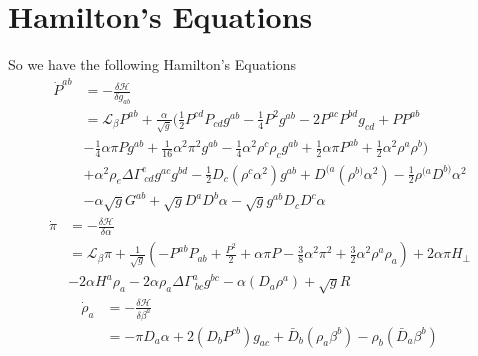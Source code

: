 \documentclass{article}
\begin{document}
\section{Hamilton's Equations}
So we have the following Hamilton's Equations
\begin{align*}
{\dot P}^{ab} &= -\frac{\delta \mathcal{H}}{\delta g_{ab}} \\ &
= \mathcal{L}_{\beta}P^{ab} + \frac{\alpha}{\sqrt{g}}(\frac{1}{2}P^{cd}P_{cd}g^{ab} - \frac{1}{4}P^{2}g^{ab} - 2P^{ac}P^{bd}g_{cd} + PP^{ab} \\
&-\frac{1}{4}\alpha \pi P g^{ab} + \frac{1}{16}\alpha^2 \pi^2 g^{ab} - \frac{1}{4}\alpha^2 \rho^{c}\rho_{c}g^{ab} + \frac{1}{2}\alpha \pi P^{ab} + \frac{1}{2}\alpha^2\rho^{a}\rho^{b}) \\
&+ \alpha^2 \rho_{e}\Delta \Gamma^{e}_{~cd}g^{ac}g^{bd} - \frac{1}{2}D_{c}(\rho^{c} \alpha^2)g^{ab} + D^{(a}(\rho^{b)} \alpha^2) - \frac{1}{2}\rho^{(a}D^{b)}\alpha^2\\
& - \alpha \sqrt{g}G^{ab} + \sqrt{g} D^{a}D^{b}\alpha - \sqrt{g}g^{ab}D_{c}D^{c} \alpha
\end{align*}
\begin{align*}
{\dot \pi} & = - \frac{\delta \mathcal{H}}{\delta \alpha} \\
& = \mathcal{L}_{\beta} \pi + \frac{1}{\sqrt{g}}(-P^{ab}P_{ab} + \frac{P^2}{2} + \alpha \pi P - \frac{3}{8}\alpha^2 \pi^2 + \frac{3}{2}\alpha^2 \rho^{a}\rho_{a}) + 2\alpha \pi H_{\perp} \\
& - 2 \alpha H^{a}\rho_{a} - 2\alpha \rho_{a} \Delta \Gamma^{a}_{~bc}g^{bc} - \alpha (D_{a}\rho^{a}) + \sqrt{g}R
\end{align*}
\begin{align*}
{\dot \rho}_{a} &= -\frac{\delta \mathcal{H}}{\delta \beta^{a}}\\
& = -\pi D_{a} \alpha + 2(D_{b}P^{cb})g_{ac} + {\bar D}_{b}(\rho_{a}\beta^{b}) - \rho_{b}({\bar D}_{a}\beta^{b})
\end{align*}
\end{document}
